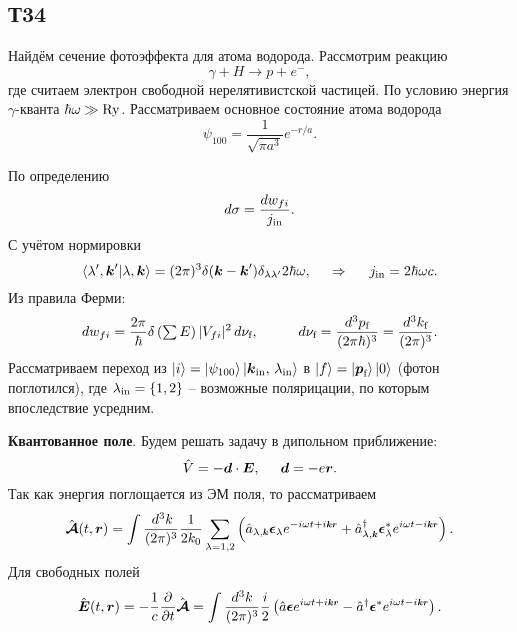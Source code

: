 \subsection*{Т34}

Найдём сечение фотоэффекта для атома водорода. Рассмотрим реакцию
\begin{equation*}
	\gamma + H \longrightarrow p + e^-,
\end{equation*}
где считаем электрон свободной нерелятивистской частицей. По условию  энергия $\gamma$-кванта $\hbar \omega \gg \mathop{\mathrm{Ry}}\nolimits$. Рассматриваем основное состояние атома водорода
\begin{equation*}
	\psi_{100} = \frac{1}{\sqrt{\pi a^3}} e^{-r/a}.
\end{equation*}

По определению
\begin{equation*}
	d \sigma = \frac{d w_{fi}}{j_{\textnormal{in}}}.
\end{equation*}
С учётом нормировки
\begin{equation*}
	\bk{\lambda', \vc{k}'}{\lambda, \vc{k}} = (2 \pi)^3 \delta(\vc{k} - \vc{k}') \delta_{\lambda \lambda'} 2 \hbar \omega,
	\hspace{0.5cm} \Rightarrow \hspace{0.5cm}
	\sub{j}{in} = 2 \hbar \omega c.
\end{equation*}
Из правила Ферми:
\begin{equation*}
	d w_{fi} = \frac{2\pi}{\hbar} \delta\left(\textstyle \sum E\right) |V_{fi}|^2 \d \nu_\text{f},
	\hspace{10 mm} 
	d \nu_\text{f} = \frac{d^3 p_\text{f}}{(2 \pi \hbar)^3} = \frac{d^3 k_\text{f}}{(2 \pi)^3}.
\end{equation*}
Рассматриваем переход из $\left| i \right\rangle = \left| \psi_{100} \right\rangle \left| \mbox{\boldmath $k$}_{\text{in}},\, \lambda_{\text{in}} \right\rangle$ в $\left| f \right\rangle = \left| \mbox{\boldmath $p$}_\text{f} \right\rangle \left| 0 \right\rangle$ (фотон поглотился), где $\lambda_{\text{in}} = \{1, 2\}$ -- возможные полярицации, по которым впоследствие усредним.

\textbf{Квантованное поле}.
Будем решать задачу в дипольном приближение:
\begin{equation*}
	\hat{V} = - \mbox{\boldmath $d$} \cdot \mbox{\boldmath $E$},
	\hspace{5 mm} 
	\mbox{\boldmath $d$} = - e \mbox{\boldmath $r$}.
\end{equation*}
Так как энергия поглощается из ЭМ поля, то рассматриваем
\begin{equation*}
	\hat{\vc{\mathcal A}}(t, \vc{r}) = \int \frac{\d^3 k}{(2\pi)^3} \frac{1}{2 k_0} \sum_{\lambda= 1, 2} \left(
		\hat{a}_{\lambda, \smallvc{k}} \vc{\epsilon}_\lambda e^{- i \omega t + i \smallvc{k} \smallvc{r}} + \hat{a}\D_{\lambda, \smallvc{k}} \vc{\epsilon}^*_\lambda e^{i \omega t - i \smallvc{k} \smallvc{r}}
	\right).
\end{equation*}
Для свободных полей
\begin{equation*}
	\hat{\vc{E}}(t, \vc{r}) = - \frac{1}{c} \frac{\partial }{\partial t} \hat{\vc{\mathcal A}} = \int \frac{d^3 k}{(2\pi)^3} \frac{i}{2} \left(
		\hat{a} \vc{\epsilon} e^{i \omega t + i \smallvc{k} \smallvc{r}} - \hat{a}\D \vc{\epsilon}^* e^{i \omega t - i \smallvc{k} \smallvc{r}}
	\right).
\end{equation*}

